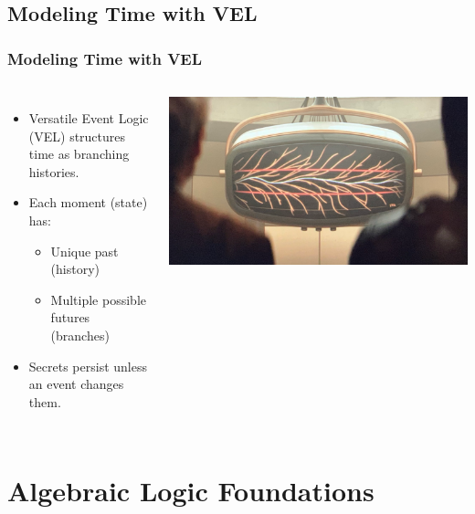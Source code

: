 \documentclass[aspectratio=169]{beamer}
\begin{document}
\subsection{Modeling Time with VEL}
\begin{frame}
\frametitle{Modeling Time with VEL}

\begin{columns}[c]


\Large
\begin{itemize}
    \item Versatile Event Logic (VEL) structures time as branching histories.
    \item Each moment (state) has:
    \begin{itemize}
        \item Unique past (history)
        \item Multiple possible futures (branches)
    \end{itemize}
    \item Secrets persist unless an event changes them.
\end{itemize}


\centering
\includegraphics[width=\linewidth]{images/timeline.png}

\end{columns}

\end{frame}

\section{Algebraic Logic Foundations}
\end{document}
